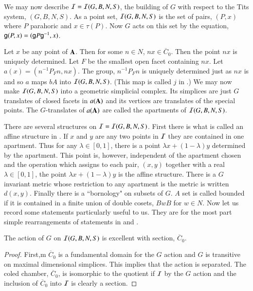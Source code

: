 We may now describe $\mathcal{I} = \mathcal{I}(G, B, N, S)$, the building of $G$ with respect to the Tits system, $(G, B, N, S)$. As a point set, $\mathcal{I}(G, B, N, S)$ is the set of pairs, $(P, x)$ where $P$ parahoric and $x \in \tau(P)$. Now $G$ acts on this set by the equation, $\mathsf{g} (P, x) = (\mathsf{g} P \mathsf{g}^{-1}, x)$. 

Let $x$ be any point of $\mathbf{A}$. Then for some $n \in N$, $nx \in \overline{C}_{0}$. Then the point $nx$ is uniquely determined. Let $F$ be the smallest open facet containing $nx$.  Let $a(x) = (n^{-1} P_{F}n, nx)$. The group, $n^{-1}P_{F}n$ is uniquely determined just as $nx$ is and so $a$ maps $bA$ into $\mathcal{I}(G, B, N, S)$. (This map is called $j$ in \cite{art6-keyBT-I}.) We may now make $\mathcal{I}(G, B, N, S)$ into a geometric simplicial complex. Its simplices are just $G$ translates of closed facets in $a(\mathbf{A})$ and its vertices are translates of the special points. The $G$-translates of $a(\mathbf{A})$ are called the apartments of $\mathcal{I}(G, B, N, S)$.

There are several structures on $\mathcal{I} = \mathcal{I}(G, B, N, S)$. First there is what is called an affine structure in \cite{art6-keyBT-I}. If $x$ and $y$ are any two points in $\mathcal{I}$ they are contained in one apartment. Thus for any $\lambda \in [0,1]$, there is a  point $\lambda x + (1- \lambda)y$ determined by the apartment. This point is, however, independent of the apartment chosen and the operation which assigns to each pair, $(x, y)$ together with a real $\lambda \in [0,1]$, the point $\lambda x + (1-\lambda)y$ is the affine structure. There is a $G$ invariant metric whose restriction to any apartment is the metric is written $d(x, y)$. Finally there is a ``bornology" on subsets of $G$. $A$ set is called bounded if it is contained in a finite union of double cosets, $BwB$ for $w \in N$. Now let us record some statements particularly useful to us. They are for the most part simple rearrangements of statements in \cite{art6-keyBT-I} and \cite{art6-keyBT-II}. 

\begin{lem}\label{art6-lemma-10.1}
The action of $G$ on $\mathcal{I}(G, B, N, S)$ is excellent with section, $\overline{C}_{0}$.
\end{lem}

\begin{proof}
First,m $\overline{C}_{0}$ is a fundamental domain for the $G$ action and $G$ is transitive on maximal dimensional simplices. This implies that the action is separated. The coled chamber, $\overline{C}_{0}$, is isomorphic to the quotient if $\mathcal{I}$ by the $G$ action and the inclusion of $\overline{C}_{0}$ into $\mathcal{I}$ is clearly a section.
\end{proof}

